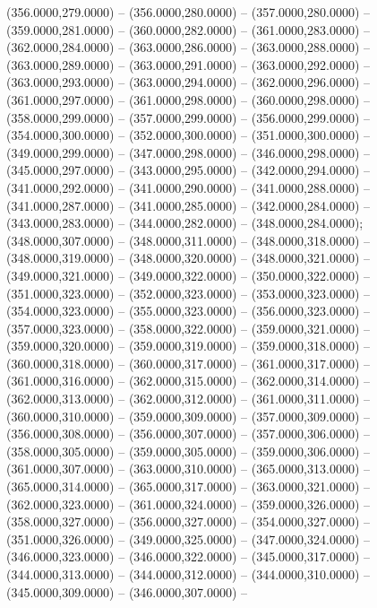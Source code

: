 \begin{scope}[shift={(-231.87,-121.87)}]
\begin{scope}[draw=black,fill=cfdae61,line join=round,line width=0.208pt]
        (356.0000,279.0000) -- (356.0000,280.0000) -- (357.0000,280.0000) --
        (359.0000,281.0000) -- (360.0000,282.0000) -- (361.0000,283.0000) --
        (362.0000,284.0000) -- (363.0000,286.0000) -- (363.0000,288.0000) --
        (363.0000,289.0000) -- (363.0000,291.0000) -- (363.0000,292.0000) --
        (363.0000,293.0000) -- (363.0000,294.0000) -- (362.0000,296.0000) --
        (361.0000,297.0000) -- (361.0000,298.0000) -- (360.0000,298.0000) --
        (358.0000,299.0000) -- (357.0000,299.0000) -- (356.0000,299.0000) --
        (354.0000,300.0000) -- (352.0000,300.0000) -- (351.0000,300.0000) --
        (349.0000,299.0000) -- (347.0000,298.0000) -- (346.0000,298.0000) --
        (345.0000,297.0000) -- (343.0000,295.0000) -- (342.0000,294.0000) --
        (341.0000,292.0000) -- (341.0000,290.0000) -- (341.0000,288.0000) --
        (341.0000,287.0000) -- (341.0000,285.0000) -- (342.0000,284.0000) --
        (343.0000,283.0000) -- (344.0000,282.0000) -- (348.0000,284.0000);
       (348.0000,307.0000) -- (348.0000,311.0000) --
        (348.0000,318.0000) -- (348.0000,319.0000) -- (348.0000,320.0000) --
        (348.0000,321.0000) -- (349.0000,321.0000) -- (349.0000,322.0000) --
        (350.0000,322.0000) -- (351.0000,323.0000) -- (352.0000,323.0000) --
        (353.0000,323.0000) -- (354.0000,323.0000) -- (355.0000,323.0000) --
        (356.0000,323.0000) -- (357.0000,323.0000) -- (358.0000,322.0000) --
        (359.0000,321.0000) -- (359.0000,320.0000) -- (359.0000,319.0000) --
        (359.0000,318.0000) -- (360.0000,318.0000) -- (360.0000,317.0000) --
        (361.0000,317.0000) -- (361.0000,316.0000) -- (362.0000,315.0000) --
        (362.0000,314.0000) -- (362.0000,313.0000) -- (362.0000,312.0000) --
        (361.0000,311.0000) -- (360.0000,310.0000) -- (359.0000,309.0000) --
        (357.0000,309.0000) -- (356.0000,308.0000) -- (356.0000,307.0000) --
        (357.0000,306.0000) -- (358.0000,305.0000) -- (359.0000,305.0000) --
        (359.0000,306.0000) -- (361.0000,307.0000) -- (363.0000,310.0000) --
        (365.0000,313.0000) -- (365.0000,314.0000) -- (365.0000,317.0000) --
        (363.0000,321.0000) -- (362.0000,323.0000) -- (361.0000,324.0000) --
        (359.0000,326.0000) -- (358.0000,327.0000) -- (356.0000,327.0000) --
        (354.0000,327.0000) -- (351.0000,326.0000) -- (349.0000,325.0000) --
        (347.0000,324.0000) -- (346.0000,323.0000) -- (346.0000,322.0000) --
        (345.0000,317.0000) -- (344.0000,313.0000) -- (344.0000,312.0000) --
        (344.0000,310.0000) -- (345.0000,309.0000) -- (346.0000,307.0000) --

\end{scope}
\end{scope}
